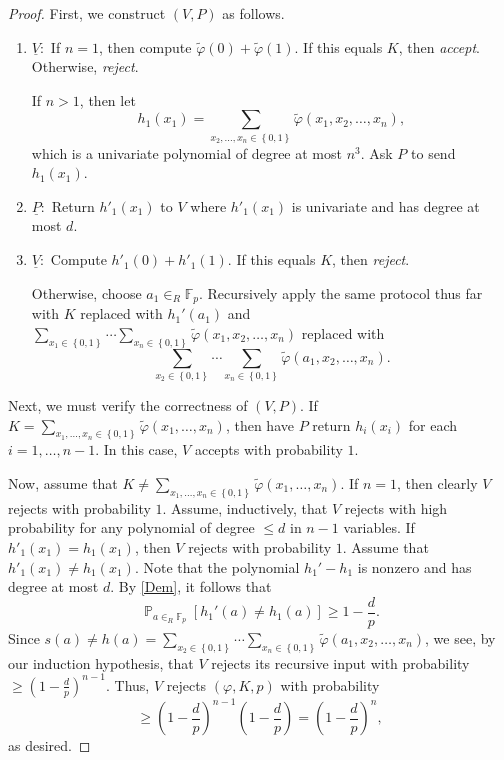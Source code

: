 \documentclass[10pt,letterpaper,cm]{nupset}
\theoremstyle{definition}
\theoremstyle{theorem}
\theoremstyle{remark}
\newcommand{\F}{\mathbb F}
\newcommand{\1}{\mathbf{1}}
\newcommand{\0}{\vec 0}
\DeclareMathOperator{\pr}{\mathbb{P}}
\begin{document}
\begin{proof} 
First, we construct $\left(V, P\right)$ as follows. 
\begin{enumerate}
\item $\underline{V}:$ If $n=1$, then compute $\tilde{\varphi}(0) + \tilde{\varphi}(1)$. If this equals $K$, then \textit{accept}. Otherwise, \textit{reject}. 

If $n>1$, then let $$h_1(x_1) = \sum_{x_2, \ldots, x_n \in \left\{0,1\right\}} \tilde{\varphi}(x_1, x_2, \ldots, x_n),$$ which is a univariate polynomial of degree at most $n^3$. Ask $P$ to send $h_1(x_1)$. 
\item $\underline{P}:$ Return  $h'_1(x_1)$ to $V$ where $h'_1(x_1)$ is univariate and has degree at most $d$. 
\item $\underline{V}:$ Compute $h'_1(0) + h'_1(1)$. If this equals $K$, then \textit{reject}. 

Otherwise,  choose $a_1 \in_R \F_p$. Recursively apply the same protocol thus far with $K$ replaced with $h_1'(a_1)$ and $ \sum_{x_1 \in \left\{0,1\right\}} \cdots \sum_{x_n \in \left\{0,1\right\}} \tilde{\varphi}(x_1, x_2, \ldots, x_n)$ replaced with $$\sum_{x_2 \in \left\{0,1\right\}} \cdots \sum_{x_n \in \left\{0,1\right\}} \tilde{\varphi}(a_1, x_2, \ldots, x_n).$$
\end{enumerate}
Next, we must verify the correctness of $\left(V,P\right)$. If $K = \sum_{x_1, \ldots, x_n \in \left\{0,1\right\}} \tilde{\varphi}(x_1, \ldots, x_n)$, then have $P$ return $h_i(x_i)$ for each $i=1, \ldots, {n-1}$. In this case, $V$ accepts with probability $1$. 

\medskip

 Now, assume that $K \ne \sum_{x_1, \ldots, x_n \in \left\{0,1\right\}} \tilde{\varphi}(x_1, \ldots, x_n)$.  If $n=1$, then clearly $V$ rejects with probability $1$. Assume, inductively, that $V$ rejects with high probability for any polynomial of degree $\leq d$ in $n-1$ variables. If $h'_1(x_1) = h_1(x_1)$, then $V$ rejects with probability $1$. Assume that $h'_1(x_1) \ne h_1(x_1)$.  Note that the polynomial $h_1' - h_1$ is nonzero and has degree at most $d$.  By \cref{Dem}, it follows that  $$\pr_{a \in_R \F_p}\left[h_1'(a) \ne h_1(a)\right] \geq 1- \frac{d}{p}.$$ Since $s(a) \ne h(a) = \sum_{x_2 \in \left\{0,1\right\}} \cdots \sum_{x_n \in \left\{0,1\right\}} \tilde{\varphi}(a_1, x_2, \ldots, x_n)$, we see, by our induction hypothesis, that $V$ rejects its recursive input with probability $\geq (1-\frac{d}{p})^{n-1}$. Thus, $V$ rejects $\left(\varphi, K, p\right)$ with probability $$ \geq \left(1-\frac{d}{p}\right)^{n-1}  \left(1-\frac{d}{p}\right) = \left(1-\frac{d}{p}\right)^{n},$$ as desired.
\end{proof}
\end{document}
